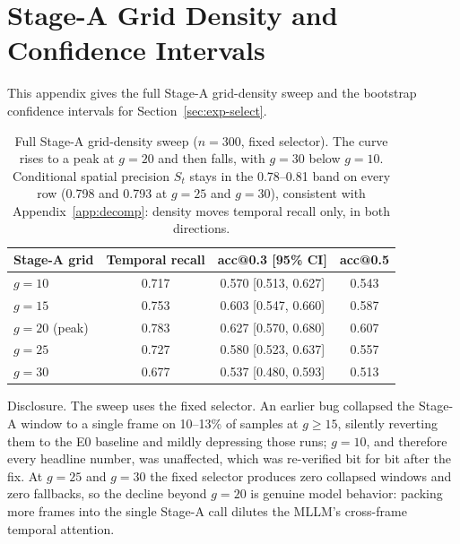 \section{Stage-A Grid Density and Confidence Intervals}\label{app:grid}

This appendix gives the full Stage-A grid-density sweep and the bootstrap confidence intervals for Section~\ref{sec:exp-select}.

\begin{table}[htbp]
\centering
\small
\begin{tabular}{lccc}
\toprule
Stage-A grid & Temporal recall & acc@0.3 [95\% CI] & acc@0.5 \\
\midrule
$g=10$ & 0.717 & 0.570 [0.513, 0.627] & 0.543 \\
$g=15$ & 0.753 & 0.603 [0.547, 0.660] & 0.587 \\
$g=20$ (peak) & 0.783 & 0.627 [0.570, 0.680] & 0.607 \\
$g=25$ & 0.727 & 0.580 [0.523, 0.637] & 0.557 \\
$g=30$ & 0.677 & 0.537 [0.480, 0.593] & 0.513 \\
\bottomrule
\end{tabular}
\caption{Full Stage-A grid-density sweep ($n=300$, fixed selector). The curve rises to a peak at $g=20$ and then falls, with $g=30$ below $g=10$. Conditional spatial precision $S_t$ stays in the 0.78--0.81 band on every row (0.798 and 0.793 at $g=25$ and $g=30$), consistent with Appendix~\ref{app:decomp}: density moves temporal recall only, in both directions.}
\label{tab:gridsweep}
\end{table}

Disclosure. The sweep uses the fixed selector. An earlier bug collapsed the Stage-A window to a single frame on 10--13\% of samples at $g \ge 15$, silently reverting them to the E0 baseline and mildly depressing those runs; $g=10$, and therefore every headline number, was unaffected, which was re-verified bit for bit after the fix. At $g=25$ and $g=30$ the fixed selector produces zero collapsed windows and zero fallbacks, so the decline beyond $g=20$ is genuine model behavior: packing more frames into the single Stage-A call dilutes the MLLM's cross-frame temporal attention.

